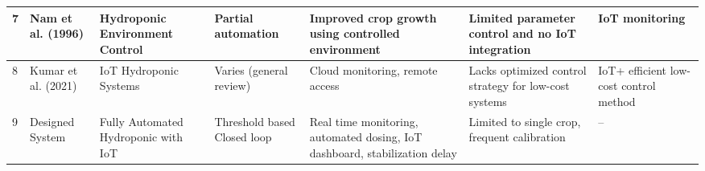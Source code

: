 \begin{longtable}{|
p{0.65cm}|
p{1.75cm}|
p{2.2cm}|
p{1.9cm}|
p{2.05cm}|
p{2.2cm}|
p{2.3cm}|}
7 & Nam et al. (1996) \cite{nam1996} & Hydroponic Environment Control & Partial automation & Improved crop growth using controlled environment & Limited parameter control and no IoT integration & IoT monitoring \\
\hline

8 & Kumar et al. (2021) \cite{kumar2021} & IoT Hydroponic Systems & Varies (general review) & Cloud monitoring, remote access & Lacks optimized control strategy for low-cost systems & IoT+ efficient low-cost control method \\
\hline

9 & Designed System & Fully Automated Hydroponic with IoT & Threshold based Closed loop & Real time monitoring, automated dosing, IoT dashboard, stabilization delay & Limited to single crop, frequent calibration & -- \\
\hline

\end{longtable}